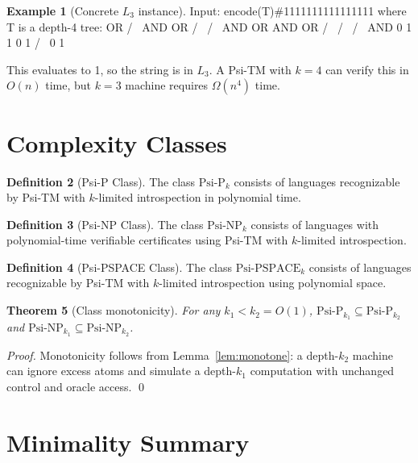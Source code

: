 \documentclass[11pt]{article}
\newtheorem{theorem}{Theorem}[section]
\theoremstyle{definition}
\newtheorem{definition}[theorem]{Definition}
\newtheorem{example}[theorem]{Example}
\begin{document}
\begin{example}[Concrete $L_3$ instance]
Input: encode(T)\#1111111111111111 where T is a depth-4 tree:
         OR
        /  \
       AND  OR
      /  \  / \
     AND  OR AND OR
    /  \  / \  / \
   AND  0 1  1 0  1
  /  \
 0    1

This evaluates to 1, so the string is in $L_3$.
A Psi-TM with $k=4$ can verify this in $O(n)$ time,
but $k=3$ machine requires $\Omega(n^4)$ time.
\end{example}

\section{Complexity Classes}

\begin{definition}[Psi-P Class]
The class $\text{Psi-P}_k$ consists of languages recognizable by Psi-TM with $k$-limited introspection in polynomial time.
\end{definition}

\begin{definition}[Psi-NP Class]
The class $\text{Psi-NP}_k$ consists of languages with polynomial-time verifiable certificates using Psi-TM with $k$-limited introspection.
\end{definition}

\begin{definition}[Psi-PSPACE Class]
The class $\text{Psi-PSPACE}_k$ consists of languages recognizable by Psi-TM with $k$-limited introspection using polynomial space.
\end{definition}

\begin{theorem}[Class monotonicity]
For any $k_1 < k_2 = O(1)$, $\text{Psi-P}_{k_1} \subseteq \text{Psi-P}_{k_2}$ and $\text{Psi-NP}_{k_1} \subseteq \text{Psi-NP}_{k_2}$.
\end{theorem}
\begin{proof}
Monotonicity follows from Lemma~\ref{lem:monotone}: a depth-$k_2$ machine can ignore excess atoms and simulate a depth-$k_1$ computation with unchanged control and oracle access. \qed
\end{proof}

\section{Minimality Summary}
\end{document}
